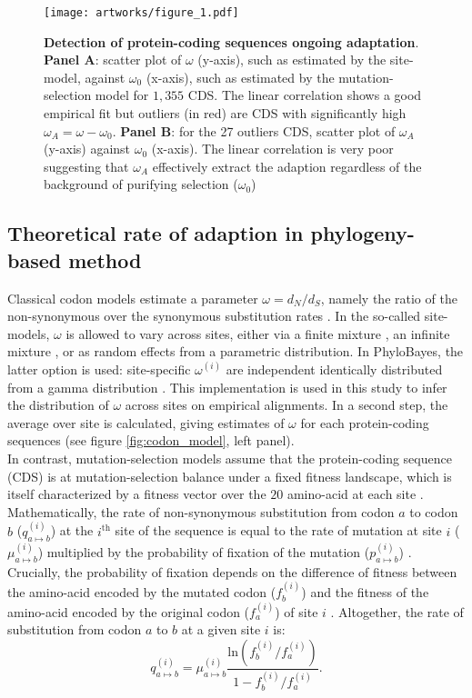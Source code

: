 \documentclass{article}
\begin{document}
	\begin{figure*}[hb!]
		\centering
		\texttt{[image: artworks/figure\_1.pdf]}\\
		\caption{ \textbf{Detection of protein-coding sequences ongoing adaptation}. \textbf{Panel A}: scatter plot of $\omega$ (y-axis), such as estimated by the site-model, against $\omega_{0}$ (x-axis), such as estimated by the mutation-selection model for $1,355$ CDS. The linear correlation shows a good empirical fit but outliers (in red) are CDS with significantly high $\omega_A = \omega - \omega_{0}$.  \textbf{Panel B}: for the 27 outliers CDS, scatter plot of $\omega_A$ (y-axis) against $\omega_{0}$ (x-axis). The linear correlation is very poor suggesting that $\omega_A$ effectively extract the adaption regardless of the background of purifying selection ($\omega_0$)  \label{fig:omega_pb}}
	\end{figure*}


	\subsection*{Theoretical rate of adaption in phylogeny-based method }
	Classical codon models estimate a parameter $\omega=d_N/d_S$, namely the ratio of the non-synonymous over the synonymous substitution rates \cite{Muse1994,Goldman1994}. In the so-called site-models, $\omega$ is allowed to vary across sites, either via a finite mixture \cite{Yang2001}, an infinite mixture \cite{Huelsenbeck2006}, or as random effects from a parametric distribution. In PhyloBayes, the latter option is used: site-specific $\omega^{(i)}$ are independent identically distributed from a gamma distribution \cite{lartillot_phylobayes_2013}. This implementation is used in this study to infer the distribution of $\omega$ across sites on empirical alignments. In a second step, the average over site is calculated, giving estimates of $\omega$ for each protein-coding sequences (see figure \ref{fig:codon_model}, left panel).  \\
	
	In contrast, mutation-selection models assume that the protein-coding sequence (CDS) is at mutation-selection balance under a fixed fitness landscape, which is itself characterized by a fitness vector over the $20$ amino-acid at each site \cite{Yang2008, Halpern1998, Rodrigue2010}. Mathematically, the rate of non-synonymous substitution from codon $a$ to codon $b$ ($q_{a \mapsto b}^{(i)}$) at the $i^{\mathrm{th}}$ site of the sequence is equal to the rate of mutation at site $i$ ($\mu_{a \mapsto b}^{(i)}$) multiplied by the probability of fixation of the mutation ($p_{a \mapsto b}^{(i)}$) \cite{kimura_neutral_1983}. Crucially, the probability of fixation depends on the difference of fitness between the amino-acid encoded by the mutated codon ($f_b^{(i)}$) and the fitness of the amino-acid encoded by the original codon ($f_a^{(i)}$) of site $i$ \cite{wright_evolution_1931, fisher_genetical_1930}. Altogether, the rate of substitution from codon $a$ to $b$ at a given site $i$ is:
	\begin{equation}
		q_{a \mapsto b}^{(i)} = \mu_{a \mapsto b}^{(i)} \dfrac{\mathrm{ln}(f_b^{(i)} / f_a^{(i)})}{1 - f_b^{(i)} / f_a^{(i)}}.
	\end{equation}
	
\end{document}
